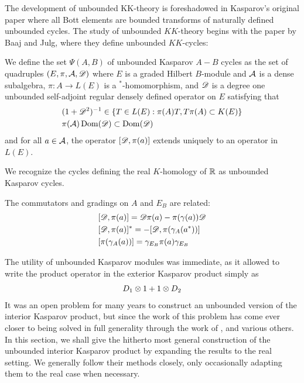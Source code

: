 The development of unbounded KK-theory is foreshadowed in Kasparov's original paper \cite{kasparov} where all Bott elements are bounded transforms of naturally defined unbounded cycles. The study of unbounded $KK$-theory begins with the paper by Baaj and Julg, \cite{baajjulg} where they define unbounded $KK$-cycles:
\begin{definition}
	We define the set $\Psi(A,B)$ of unbounded Kasparov $A-B$ cycles as the set of quadruples $(E,\pi,\mathcal{A},\mathscr{D})$ where $E$ is a graded Hilbert $B$-module and $\mathcal{A}$ is a dense subalgebra, $\pi:A\to L(E)$ is a $^*$-homomorphism, and $\mathscr{D}$ is a degree one unbounded self-adjoint regular densely defined operator on $E$ satisfying that 
	\begin{align*}
		&(1+\mathscr{D}^2)^{-1}\in \{ T\in L(E):\pi(A)T,T\pi(A)\subset K(E)\} \\
		&\pi(\mathcal{A})\operatorname{Dom}(\mathscr{D})\subset \operatorname{Dom}(\mathscr{D}) 
	\end{align*}
	and for all $a\in \mathcal{A}$, the operator $[\mathscr{D},\pi(a)]$ extends uniquely to an operator in $L(E)$. 
\end{definition}
We recognize the cycles defining the real $K$-homology of $\mathbb{R}$ as unbounded Kasparov cycles.
\begin{remark}
	The commutators and gradings on $A$ and $E_B$ are related: 
	\begin{align*}
		&[\mathscr{D},\pi(a)]=\mathscr{D}\pi(a)-\pi(\gamma(a))\mathscr{D} \\
		&[\mathscr{D},\pi(a)]^*=-[\mathscr{D},\pi(\gamma_A(a^*))] \\
		&[\pi(\gamma_A(a))]=\gamma_{E_B}\pi(a)\gamma_{E_B}
	\end{align*}
\end{remark}
The utility of unbounded Kasparov modules was immediate, as it allowed \cite{baajjulg} to write the product operator in the exterior Kasparov product simply as 
\begin{align*}
	D_1\otimes 1+1\otimes D_2
\end{align*}
It was an open problem for many years to construct an unbounded version of the interior Kasparov product, but since the work of \cite{mesland} this problem has come ever closer to being solved in full generality through the work of \cite{kaad}, \cite{suijlekom} and various others. In this section, we shall give the hitherto most general construction of the unbounded interior Kasparov product by expanding the results  \cite{mesrennie}  to the real setting. We generally follow their methods closely, only occasionally adapting them to the real case when necessary. 


